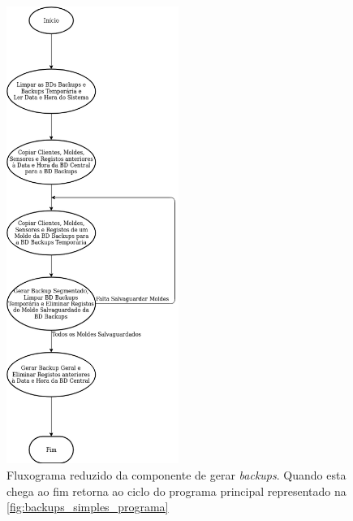 \documentclass[11pt,twoside,a4paper]{report}
\begin{document}
\begin{figure}
	\begin{center}
		\hspace{3.5cm}
		\includegraphics[width=0.5\textwidth]{fluxograma_simples_backups_gerar01} %
		\caption[Fluxograma reduzido da componente de gerar \textit{backups}]{Fluxograma reduzido da componente de gerar \textit{backups}. Quando esta chega ao fim retorna ao ciclo do programa principal representado na \autoref{fig:backups_simples_programa}}
		\label{fig:backups_simples_gerar}
	\end{center}
\end{figure}
\end{document}
